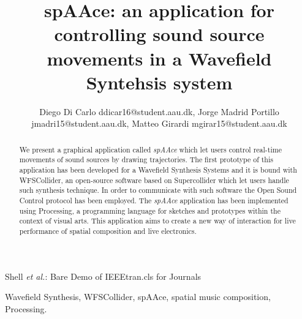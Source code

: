 \documentclass[journal]{IEEEtran}
\begin{document}
\title{spAAce: an application for controlling sound source movements in a Wavefield Syntehsis system}


\author{Diego Di Carlo ddicar16@student.aau.dk,
        Jorge Madrid Portillo jmadri15@student.aau.dk,
        Matteo Girardi mgirar15@student.aau.dk%
}


%
{Shell \MakeLowercase{\textit{et al.}}: Bare Demo of IEEEtran.cls for Journals}


\maketitle


\begin{abstract}
We present a graphical application called \emph{spAAce} which let users control real-time movements of sound sources by drawing trajectories. The first prototype of this application has been developed for a Wavefield Synthesis Systems and it is bound with WFSCollider, an open-source software based on Supercollider which let users handle such synthesis technique. In order to communicate with such software the Open Sound Control protocol has been employed. The \emph{spAAce} application has been implemented using Processing, a programming language for sketches and prototypes within the context of visual arts. This application aims to create a new way of interaction for live performance of spatial composition and live electronics.
\end{abstract}

\begin{IEEEkeywords}
Wavefield Synthesis, WFSCollider, spAAce, spatial music composition, Processing.
\end{IEEEkeywords}

\IEEEpeerreviewmaketitle
\end{document}

